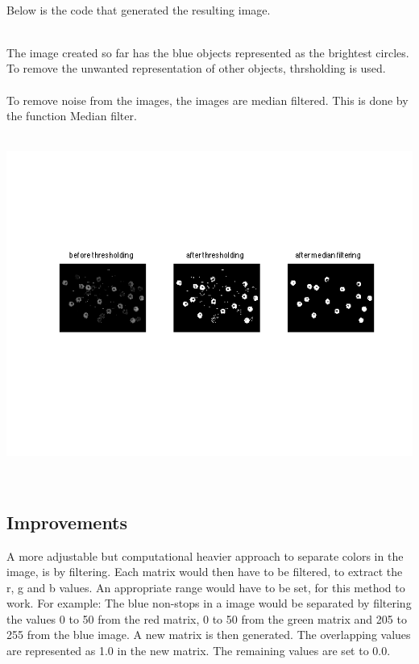 \\
Below is the code that generated the resulting image. 

\\
The image created so far has the blue objects represented as the brightest circles. To remove the unwanted representation of other objects, thrsholding is used.
\\

\\
To remove noise from the images, the images are median filtered. This is done by the function Median filter. 
\\

\\
\centerline{\includegraphics[clip=true, trim=40 100 40 80]{separate_step3_1.png}}
\\

\subsection{Improvements}
A more adjustable but computational heavier approach to separate colors in the image, is by filtering. Each matrix would then have to be filtered, to extract the r, g and b values. An appropriate range would have to be set, for this method to work. For example: The blue non-stops in a image would be separated by filtering the values 0 to 50 from the red matrix, 0 to 50 from the green matrix and 205 to 255 from the blue image. A new matrix is then generated. The overlapping values are represented as 1.0 in the new matrix. The remaining values are set to 0.0. \\



